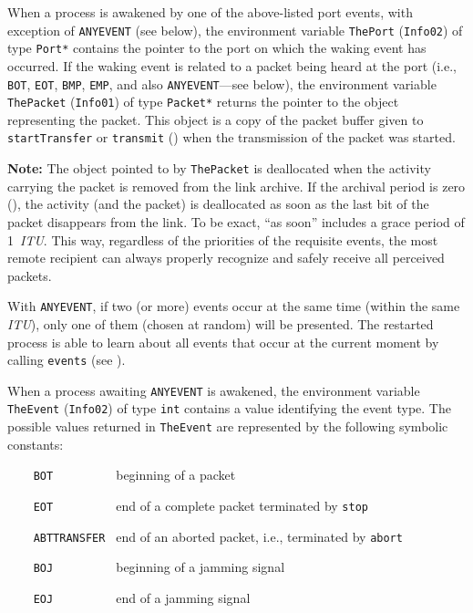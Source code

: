 When a process is awakened by one of the above-listed port events, with
exception of {\tt ANYEVENT} (see below), the environment variable
{\tt ThePort} ({\tt Info02}) of type {\tt Port*} contains the pointer
to the port on which the waking event has occurred.
If the waking event is related to a packet being
heard at the port (i.e., {\tt BOT}, {\tt EOT}, {\tt BMP}, {\tt EMP}, and
also {\tt ANYEVENT}---see below), the environment variable
{\tt ThePacket} ({\tt Info01}) of type {\tt Packet*} returns the pointer
to the object representing the packet.
This object is a copy of the packet buffer given to {\tt startTransfer}
or {\tt transmit} () when the transmission of the packet
was started.

\medskip

\noindent
{\bf Note:}
The object pointed to by {\tt ThePacket} is deallocated when the activity
carrying the packet is removed from the link archive.
If the archival period is zero (), the activity (and the
packet) is deallocated as soon as the last bit of the packet disappears from
the link.
To be exact, ``as soon'' includes a grace period of 1~{\em ITU}.
This way, regardless of the priorities of the requisite events,
the most remote recipient can always properly recognize
and safely receive all perceived packets.

\medskip

With {\tt ANYEVENT}, if two (or more) events occur at the same time
(within the same {\em ITU\/}),
only one of them (chosen at random) will be presented.
The restarted process is able to learn about all events that
occur at the current moment by calling
{\tt events} (see ).

When a process awaiting {\tt ANYEVENT} is awakened, the environment
variable {\tt TheEvent} ({\tt Info02}) of type {\tt int}
contains a value identifying the event type.
The possible values returned in {\tt TheEvent} are represented by the
following symbolic constants:

\bigskip

\noindent
{\tt ~~~~BOT~~~~~~~~~} beginning of a packet

\noindent
{\tt ~~~~EOT~~~~~~~~~} end of a complete packet terminated by {\tt stop}

\noindent
{\tt ~~~~ABTTRANSFER~} end of an aborted packet, i.e., terminated by {\tt abort}

\noindent
{\tt ~~~~BOJ~~~~~~~~~} beginning of a jamming signal

\noindent
{\tt ~~~~EOJ~~~~~~~~~} end of a jamming signal

